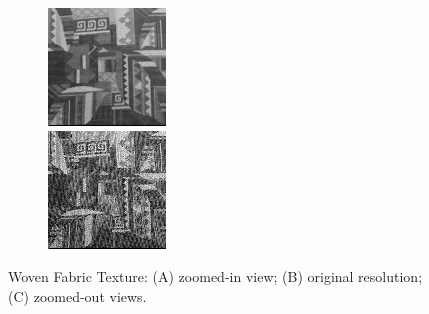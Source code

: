 \begin{figure}[!h]
\begin{subfigure}{0.39\linewidth}
\caption{}
\end{subfigure}
\begin{subfigure}{.19\linewidth}
  \centering
\includegraphics[width=\linewidth]{img/ch5/tex_zoom_out_stage_3.png}\\
\includegraphics[width=\linewidth]{img/ch5/tex_zoom_out_stage_5.png}
\caption{}
\label{f:patternC}
\end{subfigure}
\caption{Woven Fabric Texture: (A) zoomed-in view; (B) original resolution; (C) zoomed-out views.}
\label{f:pattern}
\end{figure}


